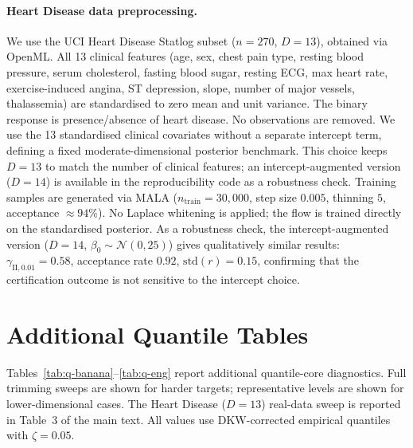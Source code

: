 \documentclass[12pt]{article}
\begin{document}
\paragraph{Heart Disease data preprocessing.}
We use the UCI Heart Disease Statlog subset ($n = 270$, $D = 13$), obtained via OpenML. All 13 clinical features (age, sex, chest pain type, resting blood pressure, serum cholesterol, fasting blood sugar, resting ECG, max heart rate, exercise-induced angina, ST depression, slope, number of major vessels, thalassemia) are standardised to zero mean and unit variance. The binary response is presence/absence of heart disease. No observations are removed. We use the 13 standardised clinical covariates without a separate intercept term, defining a fixed moderate-dimensional posterior benchmark. This choice keeps $D = 13$ to match the number of clinical features; an intercept-augmented version ($D = 14$) is available in the reproducibility code as a robustness check. Training samples are generated via MALA ($n_{\mathrm{train}} = 30{,}000$, step size $0.005$, thinning $5$, acceptance $\approx 94\%$). No Laplace whitening is applied; the flow is trained directly on the standardised posterior. As a robustness check, the intercept-augmented version ($D = 14$, $\beta_0 \sim \mathcal{N}(0, 25)$) gives qualitatively similar results: $\gamma_{\mathrm{II},0.01} = 0.58$, acceptance rate $0.92$, $\mathrm{std}(r) = 0.15$, confirming that the certification outcome is not sensitive to the intercept choice.


\section{Additional Quantile Tables}

Tables~\ref{tab:q-banana}--\ref{tab:q-eng} report additional quantile-core diagnostics. Full trimming sweeps are shown for harder targets; representative levels are shown for lower-dimensional cases. The Heart Disease ($D = 13$) real-data sweep is reported in Table~3 of the main text. All values use DKW-corrected empirical quantiles with $\zeta = 0.05$.
\end{document}
